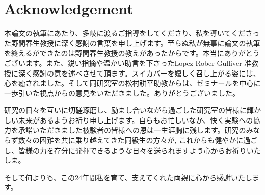 \chapter*{Acknowledgement}
\par 本論文の執筆にあたり、多岐に渡るご指導をしてくださり、私を導いてくださった野間春生教授に深く感謝の言葉を申し上げます。至らぬ私が無事に論文の執筆を終えるができたのは野間春生教授の教えがあったからです。本当にありがとうございます。また、鋭い指摘や温かい助言を下さったLopez Rober Gulliver 准教授に深く感謝の意を述べさせて頂ます。スイカバーを嬉しく召し上がる姿には、心を癒されました。そして同研究室の松村耕平助教からは、ゼミナールを中心に一歩引いた視点からの意見をいただきました。ありがとうございました。
\par 研究の日々を互いに切磋琢磨し、励まし合いながら過ごした研究室の皆様に輝かしい未来があるようお祈り申し上げます。自らもお忙しいなか、快く実験への協力を承諾いただきました被験者の皆様への恩は一生涯胸に残します。研究のみならず数々の困難を共に乗り越えてきた同級生の方々が, これからも健やかに過ごし、皆様の力を存分に発揮できるような日々を送られますよう心からお祈りいたしま。
\par そして何よりも、この24年間私を育て、支えてくれた両親に心から感謝いたします。
